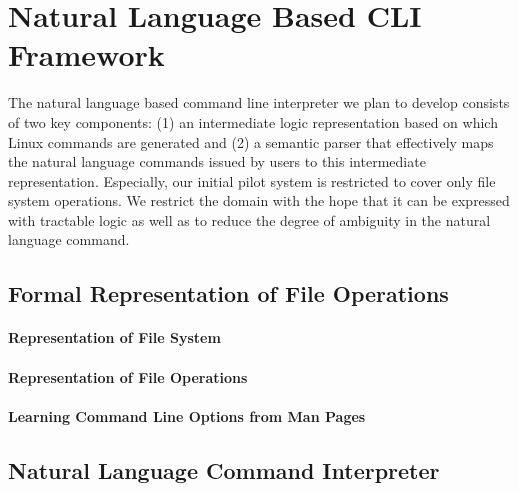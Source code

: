 \section{Natural Language Based CLI Framework}

The natural language based command line interpreter we plan to develop consists of two key components: (1) an intermediate logic representation based on which Linux commands are generated and (2) a semantic parser that effectively maps the natural language commands issued by users to this intermediate representation. Especially, our initial pilot system is restricted to cover only file system operations. We restrict the domain with the hope that it can be expressed with tractable logic as well as to reduce the degree of ambiguity in the natural language command.

\subsection{Formal Representation of File Operations}
\paragraph{Representation of File System}
\paragraph{Representation of File Operations}
\paragraph{Learning Command Line Options from Man Pages}

\subsection{Natural Language Command Interpreter}